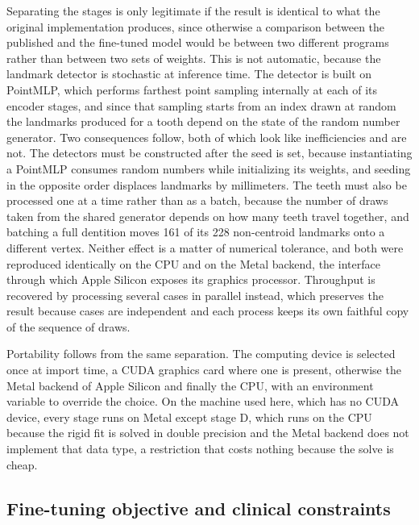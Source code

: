 \documentclass[10pt,a4paper]{article}
\begin{document}
Separating the stages is only legitimate if the result is identical to what the original implementation produces, since otherwise a comparison between the published and the fine-tuned model would be between two different programs rather than between two sets of weights. This is not automatic, because the landmark detector is stochastic at inference time. The detector is built on PointMLP, which performs farthest point sampling internally at each of its encoder stages, and since that sampling starts from an index drawn at random the landmarks produced for a tooth depend on the state of the random number generator. Two consequences follow, both of which look like inefficiencies and are not. The detectors must be constructed after the seed is set, because instantiating a PointMLP consumes random numbers while initializing its weights, and seeding in the opposite order displaces landmarks by millimeters. The teeth must also be processed one at a time rather than as a batch, because the number of draws taken from the shared generator depends on how many teeth travel together, and batching a full dentition moves 161 of its 228 non-centroid landmarks onto a different vertex. Neither effect is a matter of numerical tolerance, and both were reproduced identically on the CPU and on the Metal backend, the interface through which Apple Silicon exposes its graphics processor. Throughput is recovered by processing several cases in parallel instead, which preserves the result because cases are independent and each process keeps its own faithful copy of the sequence of draws.

Portability follows from the same separation. The computing device is selected once at import time, a CUDA graphics card where one is present, otherwise the Metal backend of Apple Silicon and finally the CPU, with an environment variable to override the choice. On the machine used here, which has no CUDA device, every stage runs on Metal except stage D, which runs on the CPU because the rigid fit is solved in double precision and the Metal backend does not implement that data type, a restriction that costs nothing because the solve is cheap.

\subsection{Fine-tuning objective and clinical constraints}
\label{sec:objective}
\end{document}

